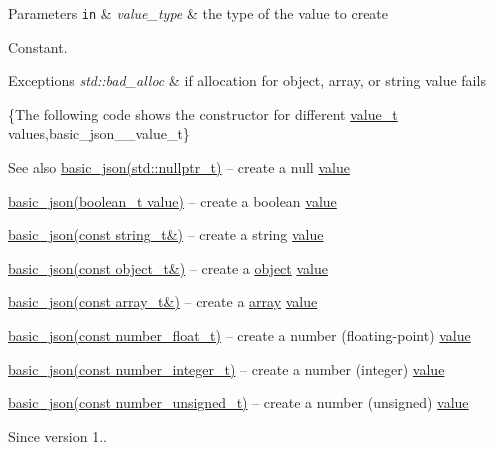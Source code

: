 \begin{DoxyParams}[1]{Parameters}
\mbox{\tt in}  & {\em value\+\_\+type} & the type of the value to create\\
\hline
\end{DoxyParams}
Constant.


\begin{DoxyExceptions}{Exceptions}
{\em std\+::bad\+\_\+alloc} & if allocation for object, array, or string value fails\\
\hline
\end{DoxyExceptions}
\{The following code shows the constructor for different \hyperlink{a00025_a231b02148577b69a154b2ce2c87a5522}{value\+\_\+t} values,basic\+\_\+json\+\_\+\+\_\+value\+\_\+t\}

\begin{DoxySeeAlso}{See also}
\hyperlink{a00025_ade0e56c8c320d7f342e7a5697e6d6f7e}{basic\+\_\+json(std\+::nullptr\+\_\+t)} -- create a {\ttfamily null} \hyperlink{a00025_a0a2cbbd95862a623e7dc5c37e67dead0}{value} 

\hyperlink{a00025_aac36af84d907b5c3e469af889661620a}{basic\+\_\+json(boolean\+\_\+t value)} -- create a boolean \hyperlink{a00025_a0a2cbbd95862a623e7dc5c37e67dead0}{value} 

\hyperlink{a00025_ab8b43d92a042dde96c28aeea81dd52de}{basic\+\_\+json(const string\+\_\+t\&)} -- create a string \hyperlink{a00025_a0a2cbbd95862a623e7dc5c37e67dead0}{value} 

\hyperlink{a00025_a9af5ea68c88f423ddf35216aff7f1813}{basic\+\_\+json(const object\+\_\+t\&)} -- create a \hyperlink{a00025_ad25b2f8c21e241e2d63455537a9294ff}{object} \hyperlink{a00025_a0a2cbbd95862a623e7dc5c37e67dead0}{value} 

\hyperlink{a00025_a3aaf41d385f0d9a93deb92f9b14ae0cf}{basic\+\_\+json(const array\+\_\+t\&)} -- create a \hyperlink{a00025_a5685815624b086caa532f41e853d4b0f}{array} \hyperlink{a00025_a0a2cbbd95862a623e7dc5c37e67dead0}{value} 

\hyperlink{a00025_a2badcf191deabf579abcf8d3654da26f}{basic\+\_\+json(const number\+\_\+float\+\_\+t)} -- create a number (floating-\/point) \hyperlink{a00025_a0a2cbbd95862a623e7dc5c37e67dead0}{value} 

\hyperlink{a00025_a0d838bc7ffca6017f51167e0a8ffd9b6}{basic\+\_\+json(const number\+\_\+integer\+\_\+t)} -- create a number (integer) \hyperlink{a00025_a0a2cbbd95862a623e7dc5c37e67dead0}{value} 

\hyperlink{a00025_a85b09b03916d3d1e73373f49cdd4136d}{basic\+\_\+json(const number\+\_\+unsigned\+\_\+t)} -- create a number (unsigned) \hyperlink{a00025_a0a2cbbd95862a623e7dc5c37e67dead0}{value}
\end{DoxySeeAlso}
\begin{DoxySince}{Since}
version 1.. 
\end{DoxySince}

